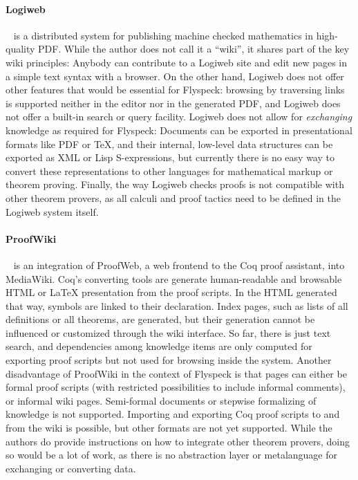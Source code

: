 \documentclass{llncs}
\begin{document}
\paragraph{Logiweb}~\cite{Grue:Logiweb07} is a distributed system for publishing machine
checked mathematics in high-quality PDF.  While the author does not call it a ``wiki'', it
shares part of the key wiki principles: Anybody can contribute to a Logiweb site and edit
new pages in a simple text syntax with a browser.  On the other hand, Logiweb does not
offer other features that would be essential for Flyspeck: browsing by traversing links is
supported neither in the editor nor in the generated PDF, and Logiweb does not offer a
built-in search or query facility.  Logiweb does not allow for \emph{exchanging} knowledge
as required for Flyspeck: Documents can be exported in presentational formats like PDF or
\TeX{}, and their internal, low-level data structures can be exported as XML or Lisp
S-expressions, but currently there is no easy way to convert these representations to
other languages for mathematical markup or theorem proving.  Finally, the way Logiweb
checks proofs is not compatible with other theorem provers, as all calculi and proof
tactics need to be defined in the Logiweb system itself.

\paragraph{ProofWiki}~\cite{CorKal:CoopReposFormalProofs07} is an integration of ProofWeb,
a web frontend to the Coq proof assistant, into MediaWiki.  Coq's converting tools are
generate human-readable and browsable HTML or {\LaTeX} presentation from the proof
scripts.  In the HTML generated that way, symbols are linked to their declaration.  Index
pages, such as lists of all definitions or all theorems, are generated, but their
generation cannot be influenced or customized through the wiki
interface.  So far, there is just text search, and dependencies
among knowledge items are only computed for exporting proof scripts but not used for
browsing inside the system.  Another disadvantage of ProofWiki in the context of Flyspeck
is that pages can either be formal proof scripts (with restricted possibilities to include
informal comments), or informal wiki pages.  Semi-formal documents or stepwise formalizing
of knowledge is not supported.  Importing and exporting Coq proof scripts to and from the
wiki is possible, but other formats are not yet supported.  While the authors do provide
instructions on how to integrate other theorem provers, doing so would be a lot of work,
as there is no abstraction layer or metalanguage for exchanging or converting data.
\end{document}

